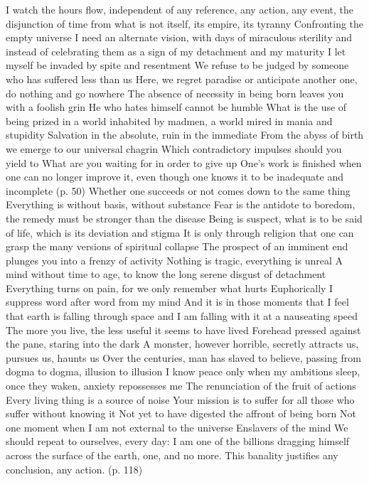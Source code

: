 \documentclass{article}
\begin{document}
I watch the hours flow, independent of any reference, any action, any event, the disjunction of time from what is not itself, its empire, its tyranny
Confronting the empty universe
I need an alternate vision, with days of miraculous sterility and instead of celebrating them as a sign of my detachment and my maturity
I let myself be invaded by spite and resentment
We refuse to be judged by someone who has suffered less than us
Here, we regret paradise or anticipate another one, do nothing and go nowhere
The absence of necessity in being born leaves you with a foolish grin
He who hates himself cannot be humble
What is the use of being prized in a world inhabited by madmen, a world mired in mania and stupidity
Salvation in the absolute, ruin in the immediate
From the abyss of birth we emerge to our universal chagrin
Which contradictory impulses should you yield to
What are you waiting for in order to give up
One's work is finished when one can no longer improve it, even though one knows it to be inadequate and incomplete (p. 50)
Whether one succeeds or not comes down to the same thing
Everything is without basis, without substance
Fear is the antidote to boredom, the remedy must be stronger than the disease
Being is suspect, what is to be said of life, which is its deviation and stigma
It is only through religion that one can grasp the many versions of spiritual collapse
The prospect of an imminent end plunges you into a frenzy of activity
Nothing is tragic, everything is unreal
A mind without time to age, to know the long serene disgust of detachment
Everything turns on pain, for we only remember what hurts
Euphorically I suppress word after word from my mind
And it is in those moments that I feel that earth is falling through space and I am falling with it at a nauseating speed
The more you live, the less useful it seems to have lived
Forehead pressed against the pane, staring into the dark
A monster, however horrible, secretly attracts us, pursues us, haunts us
Over the centuries, man has slaved to believe, passing from dogma to dogma, illusion to illusion
I know peace only when my ambitions sleep, once they waken, anxiety repossesses me
The renunciation of the fruit of actions
Every living thing is a source of noise
Your mission is to suffer for all those who suffer without knowing it
Not yet to have digested the affront of being born
Not one moment when I am not external to the universe
Enslavers of the mind
We should repeat to ourselves, every day: I am one of the billions dragging himself across the surface of the earth, one, and no more. This banality justifies any conclusion, any action. (p. 118)
\end{document}
